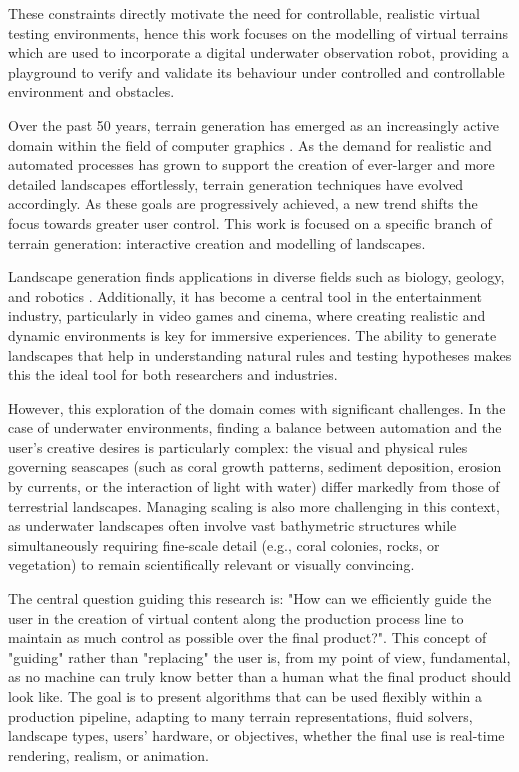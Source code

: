 These constraints directly motivate the need for controllable, realistic virtual testing environments, hence this work focuses on the modelling of virtual terrains which are used to incorporate a digital underwater observation robot, providing a playground to verify and validate its behaviour under controlled and controllable environment and obstacles.

Over the past 50 years, terrain generation has emerged as an increasingly active domain within the field of computer graphics \cite{Fournier1982,Musgrave1989,Miller1986,Galin2019}. As the demand for realistic and automated processes has grown to support the creation of ever-larger and more detailed landscapes effortlessly, terrain generation techniques have evolved accordingly. As these goals are progressively achieved, a new trend shifts the focus towards greater user control. This work is focused on a specific branch of terrain generation: interactive creation and modelling of landscapes.

Landscape generation finds applications in diverse fields such as biology, geology, and robotics \cite{Tzachor2023,Chen2023,Gerigk2025,Rudin2022}. Additionally, it has become a central tool in the entertainment industry, particularly in video games and cinema, where creating realistic and dynamic environments is key for immersive experiences. The ability to generate landscapes that help in understanding natural rules and testing hypotheses makes this the ideal tool for both researchers and industries.

However, this exploration of the domain comes with significant challenges. In the case of underwater environments, finding a balance between automation and the user's creative desires is particularly complex: the visual and physical rules governing seascapes (such as coral growth patterns, sediment deposition, erosion by currents, or the interaction of light with water) differ markedly from those of terrestrial landscapes. Managing scaling is also more challenging in this context, as underwater landscapes often involve vast bathymetric structures while simultaneously requiring fine-scale detail (e.g., coral colonies, rocks, or vegetation) to remain scientifically relevant or visually convincing.

The central question guiding this research is: "How can we efficiently guide the user in the creation of virtual content along the production process line to maintain as much control as possible over the final product?". This concept of "guiding" rather than "replacing" the user is, from my point of view, fundamental, as no machine can truly know better than a human what the final product should look like. The goal is to present algorithms that can be used flexibly within a production pipeline, adapting to many terrain representations, fluid solvers, landscape types, users' hardware, or objectives, whether the final use is real-time rendering, realism, or animation.

